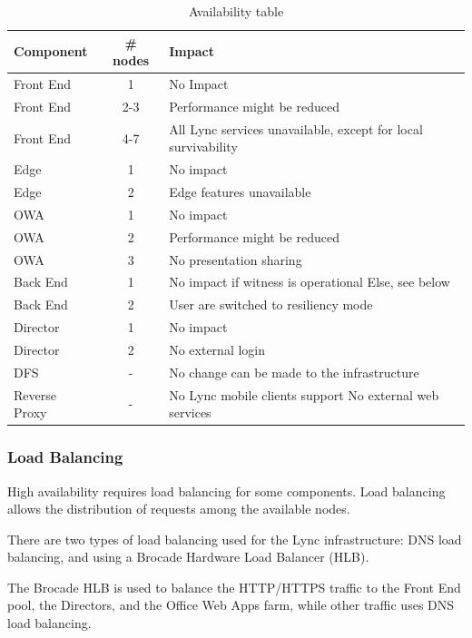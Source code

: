 \begin{table}[H]
		\centering
		\begin{tabularx}{\textwidth}{lcX}
			Component & \# nodes & Impact  \\ \hline 
			Front End & 1 & No Impact \\
			Front End & 2-3 & Performance might be reduced \\
			Front End & 4-7 & All Lync services unavailable, except for local survivability \\
			Edge & 1 & No impact \\
			Edge & 2 & Edge features unavailable \\
			OWA & 1 & No impact \\
			OWA & 2 & Performance might be reduced \\
			OWA & 3 & No presentation sharing \\
			Back End & 1 &  No impact if witness is operational \newline Else, see below\\
			Back End & 2 & User are switched to resiliency mode \\
			Director & 1 & No impact \\
			Director & 2 & No external login \\
			DFS & - & No change can be made to the infrastructure \\
			Reverse Proxy & - & No Lync mobile clients support \newline No external web services \\
		\end{tabularx}
		\caption{\label{tab:case_ha} Availability table}
		\end{table}



\subsubsection{Load Balancing}
High availability requires load balancing for some components. Load balancing allows the distribution of requests among the available nodes.

There are two types of load balancing used for the Lync infrastructure: DNS load balancing, and using a Brocade Hardware Load Balancer (HLB).

The Brocade HLB is used to balance the HTTP/HTTPS traffic to the Front End pool, the Directors, and the Office Web Apps farm, while other traffic uses DNS load balancing.



